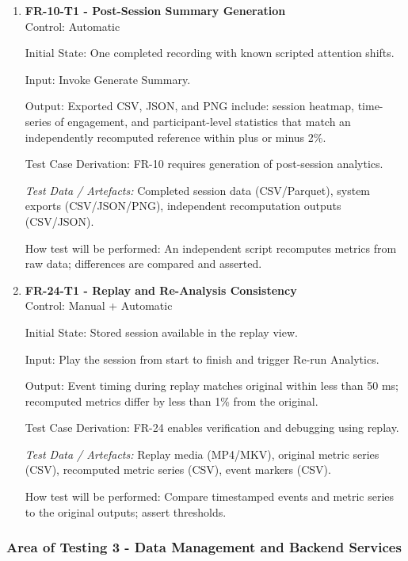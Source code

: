\documentclass[12pt, titlepage]{article}
\begin{document}
\begin{enumerate}
\item \textbf{FR-10-T1 - Post-Session Summary Generation} \\

Control: Automatic

Initial State: One completed recording with known scripted attention shifts.

Input: Invoke Generate Summary.

Output: Exported CSV, JSON, and PNG include: session heatmap, time-series of engagement, and participant-level statistics that match an independently recomputed reference within plus or minus 2\%.

Test Case Derivation: FR-10 requires generation of post-session analytics.

\textit{Test Data / Artefacts:} Completed session data (CSV/Parquet), system exports (CSV/JSON/PNG), independent recomputation outputs (CSV/JSON).

How test will be performed: An independent script recomputes metrics from raw data; differences are compared and asserted.

\item \textbf{FR-24-T1 - Replay and Re-Analysis Consistency} \\

Control: Manual + Automatic

Initial State: Stored session available in the replay view.

Input: Play the session from start to finish and trigger Re-run Analytics.

Output: Event timing during replay matches original within less than 50 ms; recomputed metrics differ by less than 1\% from the original.

Test Case Derivation: FR-24 enables verification and debugging using replay.

\textit{Test Data / Artefacts:} Replay media (MP4/MKV), original metric series (CSV), recomputed metric series (CSV), event markers (CSV).

How test will be performed: Compare timestamped events and metric series to the original outputs; assert thresholds.

\end{enumerate}


\subsubsection{Area of Testing 3 - Data Management and Backend Services}
\end{document}
